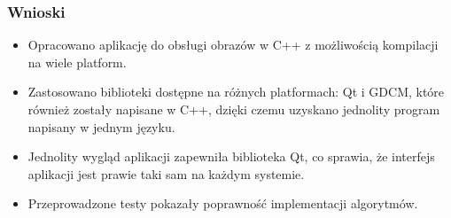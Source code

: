 \documentclass[aspectratio=169]{beamer}
\begin{document}
\begin{frame}
    \frametitle{Wnioski}
    \begin{itemize}
        \item Opracowano aplikację do obsługi obrazów \DICOM w C++ z możliwością kompilacji na wiele platform.
        \item Zastosowano biblioteki dostępne na różnych platformach: Qt i GDCM, które również zostały napisane w C++, dzięki czemu uzyskano jednolity program napisany w jednym języku.
        \item Jednolity wygląd aplikacji zapewniła biblioteka Qt, co sprawia, że interfejs aplikacji jest prawie taki sam na każdym systemie.
        \item Przeprowadzone testy pokazały poprawność implementacji algorytmów.
    \end{itemize}


\end{frame}
\end{document}
